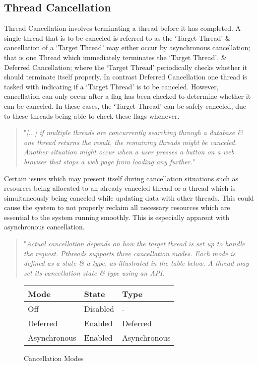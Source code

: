 \documentclass[a4paper,11pt]{article}
\begin{document}
\subsection{Thread Cancellation}
Thread Cancellation involves terminating a thread before it has completed. A single thread that is to be canceled is referred to as the ‘Target Thread’ \& cancellation of a ‘Target Thread’ may either occur by asynchronous cancellation; that is one Thread which immediately terminates the ‘Target Thread’, \& Deferred Cancellation; where the ‘Target Thread’ periodically checks whether it should terminate itself properly.
\newline\indent In contrast Deferred Cancellation one thread is tasked with indicating if a ‘Target Thread’ is to be canceled. However, cancellation can only occur after a flag has been checked to determine whether it can be canceled. In these cases, the ‘Target Thread’ can be safely canceled, due to these threads being able to check these flags whenever.\cite{Operatingsystemconcepts}

\begin{quotation}
"\emph{[...] if multiple threads are concurrently searching through a database \& one thread returns the result, the remaining threads might be canceled. Another situation might occur when a user presses a button on a web browser that stops a web page from loading any further.}" \cite{Operatingsystemconcepts}
\end{quotation}

\noindent Certain issues which may present itself during cancellation situations such as resources being allocated to an already canceled thread or a thread which is simultaneously being canceled while updating data with other threads. This could cause the system to not properly reclaim all necessary resources which are essential to the system running smoothly. This is especially apparent with asynchronous cancellation.\cite{Operatingsystemconcepts}

\begin{quotation}
"\emph{Actual cancellation depends on how the target thread is set up to handle the request. Pthreads supports three cancellation modes. Each mode is defined as a state \& a type, as illustrated in the table below. A thread may set its cancellation state \& type using an API.}
\end{quotation}
\begin{figure}[h]
    \centering
    \caption{Cancellation Modes}
    \label{fig:my_label}
    \begin{tabular}{ |p{3.5cm}|p{3.5cm}|p{3.5cm}| }
        \hline
        Mode & State & Type\\
        \hline
        Off & Disabled & -\\
        Deferred & Enabled & Deferred\\
        Asynchronous & Enabled & Asynchronous\\
        \hline
    \end{tabular}
\end{figure}
\end{document}
